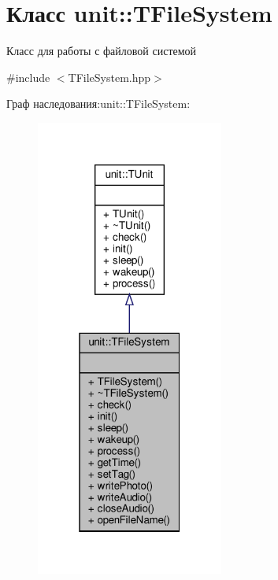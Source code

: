 \hypertarget{classunit_1_1_t_file_system}{}\section{Класс unit\+:\+:T\+File\+System}
\label{classunit_1_1_t_file_system}


Класс для работы с файловой системой  




{\ttfamily \#include $<$T\+File\+System.\+hpp$>$}



Граф наследования\+:unit\+:\+:T\+File\+System\+:\nopagebreak
\begin{figure}[H]
\begin{center}
\leavevmode
\includegraphics[width=175pt]{classunit_1_1_t_file_system__inherit__graph}
\end{center}
\end{figure}


